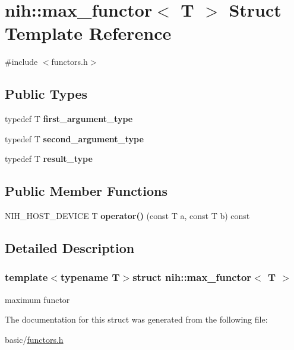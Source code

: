 \hypertarget{structnih_1_1max__functor}{
\section{nih\-:\-:max\-\_\-functor$<$ \-T $>$ \-Struct \-Template \-Reference}
\label{structnih_1_1max__functor}
}


{\ttfamily \#include $<$functors.\-h$>$}

\subsection*{\-Public \-Types}
\begin{DoxyCompactItemize}
\item 
\hypertarget{structnih_1_1max__functor_a92d715a24d4757bac951e3b38a0b85df}{
typedef \-T {\bfseries first\-\_\-argument\-\_\-type}}
\label{structnih_1_1max__functor_a92d715a24d4757bac951e3b38a0b85df}

\item 
\hypertarget{structnih_1_1max__functor_adb029bd6c9a2a73aeac260efe039d4ed}{
typedef \-T {\bfseries second\-\_\-argument\-\_\-type}}
\label{structnih_1_1max__functor_adb029bd6c9a2a73aeac260efe039d4ed}

\item 
\hypertarget{structnih_1_1max__functor_a53529f344dda32c9a1d3b7224137726b}{
typedef \-T {\bfseries result\-\_\-type}}
\label{structnih_1_1max__functor_a53529f344dda32c9a1d3b7224137726b}

\end{DoxyCompactItemize}
\subsection*{\-Public \-Member \-Functions}
\begin{DoxyCompactItemize}
\item 
\hypertarget{structnih_1_1max__functor_a7582c9543009b7180d04f82410c448d8}{
\-N\-I\-H\-\_\-\-H\-O\-S\-T\-\_\-\-D\-E\-V\-I\-C\-E \-T {\bfseries operator()} (const \-T a, const \-T b) const }
\label{structnih_1_1max__functor_a7582c9543009b7180d04f82410c448d8}

\end{DoxyCompactItemize}


\subsection{\-Detailed \-Description}
\subsubsection*{template$<$typename T$>$struct nih\-::max\-\_\-functor$<$ T $>$}

maximum functor 

\-The documentation for this struct was generated from the following file\-:\begin{DoxyCompactItemize}
\item 
basic/\hyperlink{functors_8h}{functors.\-h}\end{DoxyCompactItemize}
